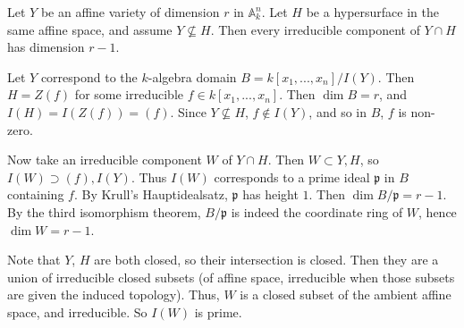 \begin{questions}
\question Let $Y$ be an affine variety of dimension $r$ in $\mathbb{A}_k^n$. Let
$H$ be a hypersurface in the same affine space, and assume $Y \not\subseteq H$.
Then every irreducible component of $Y \cap H$ has dimension $r - 1$.
\begin{solution}
Let $Y$ correspond to the $k$-algebra domain $B = k[x_1, ..., x_n]/I(Y)$. Then
$H = Z(f)$ for some irreducible $f \in k[x_1, ..., x_n]$. Then $\dim B = r$, and
$I(H) = I(Z(f)) = (f)$. Since $Y \not\subseteq H$, $f \not \in I(Y)$, and so in
$B$, $f$ is non-zero.

Now take an irreducible component $W$ of $Y \cap H$. Then $W \subset Y, H$, so
$I(W) \supset (f), I(Y)$. Thus $I(W)$ corresponds to a prime ideal $\mathfrak
{p}$ in $B$ containing $f$. By Krull's Hauptidealsatz, $\mathfrak{p}$ has height
$1$. Then $\dim B/\mathfrak{p} = r - 1$. By the third isomorphism theorem,
$B/\mathfrak{p}$ is indeed the coordinate ring of $W$, hence $\dim W = r - 1$.
\\
\begin{rmk}
Note that $Y$, $H$ are both closed, so their intersection is closed. Then they
are a union of irreducible closed subsets (of affine space, irreducible when
those subsets are given the induced topology). Thus, $W$ is a closed subset of
the ambient affine space, and irreducible. So $I(W)$ is prime.
\end{rmk}
\end{solution}


\end{questions}
